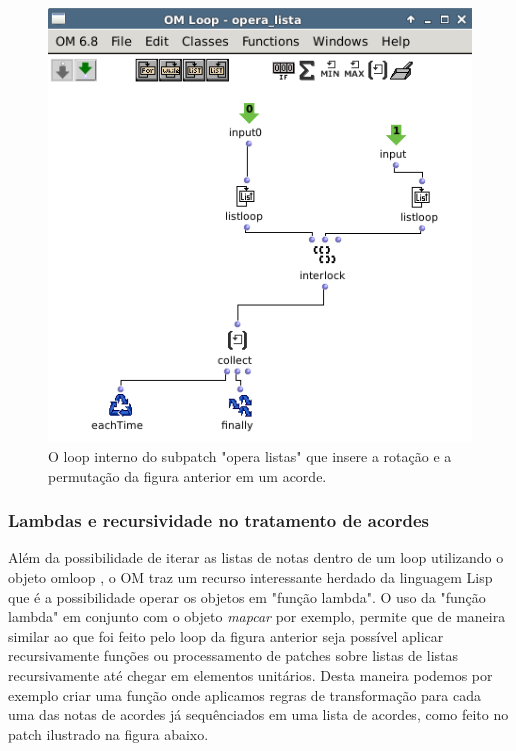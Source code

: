 \documentclass[
	12pt,				%
	openright,			%
	twoside,			%
	a4paper,			%
	english,			%
	french,				%
	spanish,			%
	brazil				%
	]{abntex2}
\begin{document}
\begin{figure}[!h]
	\caption{\label{fig_grafico}O loop interno do subpatch "opera listas" que insere a rotação e a permutação da figura anterior em um acorde. }
	\begin{center}
	    \includegraphics[scale=0.5]{OMPD/opera_listas.png}
	\end{center}
\end{figure}


\subsubsection{Lambdas e recursividade no tratamento de acordes}

Além da possibilidade de iterar as listas de notas dentro de um loop utilizando o objeto omloop , o OM traz um recurso interessante herdado da linguagem Lisp que é a possibilidade operar os objetos em "função lambda". O uso da "função lambda" em conjunto com o objeto \textit{mapcar} por exemplo, permite que de maneira similar ao que foi feito pelo loop da figura anterior seja possível aplicar recursivamente funções ou processamento de patches sobre listas de listas recursivamente até chegar em elementos unitários. Desta maneira podemos por exemplo criar uma função onde aplicamos regras de transformação para cada uma das notas de acordes já sequênciados em uma lista de acordes, como feito no patch ilustrado na figura abaixo.
\end{document}
